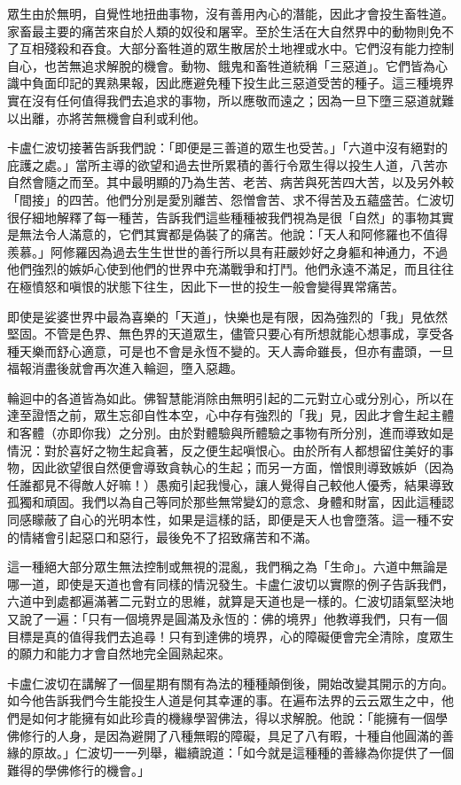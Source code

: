 眾生由於無明，自覺性地扭曲事物，沒有善用內心的潛能，因此才會投生畜牲道。家畜最主要的痛苦來自於人類的奴役和屠宰。至於生活在大自然界中的動物則免不了互相殘殺和吞食。大部分畜牲道的眾生散居於土地裡或水中。它們沒有能力控制自心，也苦無追求解脫的機會。動物、餓鬼和畜牲道統稱「三惡道」。它們皆為心識中負面印記的異熟果報，因此應避免種下投生此三惡道受苦的種子。這三種境界實在沒有任何值得我們去追求的事物，所以應敬而遠之；因為一旦下墮三惡道就難以出離，亦將苦無機會自利或利他。

卡盧仁波切接著告訴我們說：「即便是三善道的眾生也受苦。」「六道中沒有絕對的庇護之處。」當所主導的欲望和過去世所累積的善行令眾生得以投生人道，八苦亦自然會隨之而至。其中最明顯的乃為生苦、老苦、病苦與死苦四大苦，以及另外較「間接」的四苦。他們分別是愛別離苦、怨憎會苦、求不得苦及五蘊盛苦。仁波切很仔細地解釋了每一種苦，告訴我們這些種種被我們視為是很「自然」的事物其實是無法令人滿意的，它們其實都是偽裝了的痛苦。他說：「天人和阿修羅也不值得羨慕。」阿修羅因為過去生生世世的善行所以具有莊嚴妙好之身軀和神通力，不過他們強烈的嫉妒心使到他們的世界中充滿戰爭和打鬥。他們永遠不滿足，而且往往在極憤怒和嗔恨的狀態下往生，因此下一世的投生一般會變得異常痛苦。

即使是娑婆世界中最為喜樂的「天道」，快樂也是有限，因為強烈的「我」見依然堅固。不管是色界、無色界的天道眾生，儘管只要心有所想就能心想事成，享受各種天樂而舒心適意，可是也不會是永恆不變的。天人壽命雖長，但亦有盡頭，一旦福報消盡後就會再次進入輪迴，墮入惡趣。

輪迴中的各道皆為如此。佛智慧能消除由無明引起的二元對立心或分別心，所以在達至證悟之前，眾生忘卻自性本空，心中存有強烈的「我」見，因此才會生起主體和客體（亦即你我）之分別。由於對體驗與所體驗之事物有所分別，進而導致如是情況：對於喜好之物生起貪著，反之便生起嗔恨心。由於所有人都想留住美好的事物，因此欲望很自然便會導致貪執心的生起；而另一方面，憎恨則導致嫉妒（因為任誰都見不得敵人好嘛！）愚痴引起我慢心，讓人覺得自己較他人優秀，結果導致孤獨和頑固。我們以為自己等同於那些無常變幻的意念、身體和財富，因此這種認同感矇蔽了自心的光明本性，如果是這樣的話，即便是天人也會墮落。這一種不安的情緒會引起惡口和惡行，最後免不了招致痛苦和不滿。

這一種絕大部分眾生無法控制或無視的混亂，我們稱之為「生命」。六道中無論是哪一道，即使是天道也會有同樣的情況發生。卡盧仁波切以實際的例子告訴我們，六道中到處都遍滿著二元對立的思維，就算是天道也是一樣的。仁波切語氣堅決地又說了一遍：「只有一個境界是圓滿及永恆的：佛的境界」他教導我們，只有一個目標是真的值得我們去追尋！只有到達佛的境界，心的障礙便會完全清除，度眾生的願力和能力才會自然地完全圓熟起來。

卡盧仁波切在講解了一個星期有關有為法的種種顛倒後，開始改變其開示的方向。如今他告訴我們今生能投生人道是何其幸運的事。在遍布法界的云云眾生之中，他們是如何才能擁有如此珍貴的機緣學習佛法，得以求解脫。他說：「能擁有一個學佛修行的人身，是因為避開了八種無暇的障礙，具足了八有暇，十種自他圓滿的善緣的原故。」仁波切一一列舉，繼續說道：「如今就是這種種的善緣為你提供了一個難得的學佛修行的機會。」

